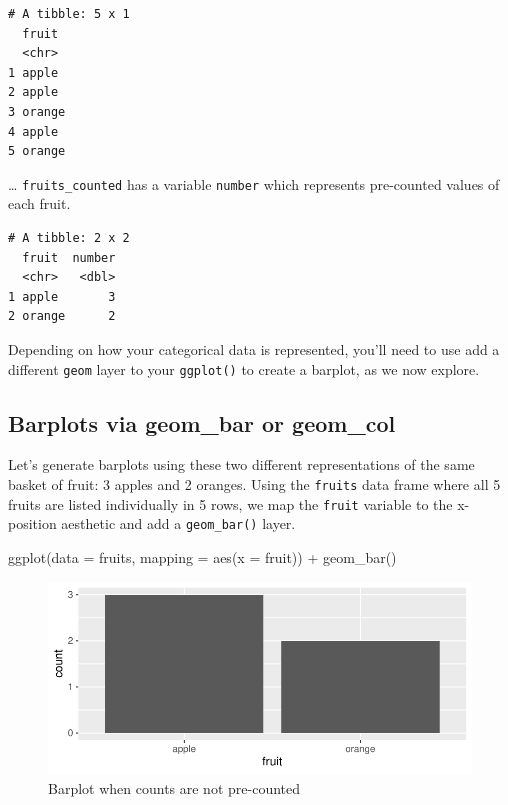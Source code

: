 \documentclass[
  letterpaper,
  DIV=11,
  numbers=noendperiod]{scrreprt}
\newenvironment{Shaded}{\begin{snugshade}}{\end{snugshade}}
\newcommand{\AttributeTok}[1]{\textcolor[rgb]{0.40,0.45,0.13}{#1}}
\newcommand{\FunctionTok}[1]{\textcolor[rgb]{0.28,0.35,0.67}{#1}}
\newcommand{\NormalTok}[1]{\textcolor[rgb]{0.00,0.23,0.31}{#1}}
\newcommand{\SpecialCharTok}[1]{\textcolor[rgb]{0.37,0.37,0.37}{#1}}
\theoremstyle{definition}
\theoremstyle{remark}
\begin{document}
\begin{verbatim}
# A tibble: 5 x 1
  fruit 
  <chr> 
1 apple 
2 apple 
3 orange
4 apple 
5 orange
\end{verbatim}

\ldots{} \texttt{fruits\_counted} has a variable \texttt{number} which
represents pre-counted values of each fruit.

\begin{verbatim}
# A tibble: 2 x 2
  fruit  number
  <chr>   <dbl>
1 apple       3
2 orange      2
\end{verbatim}

Depending on how your categorical data is represented, you'll need to
use add a different \texttt{geom} layer to your \texttt{ggplot()} to
create a barplot, as we now explore.

\hypertarget{barplots-via-geom_bar-or-geom_col}{%
\subsection{Barplots via geom\_bar or
geom\_col}\label{barplots-via-geom_bar-or-geom_col}}

Let's generate barplots using these two different representations of the
same basket of fruit: 3 apples and 2 oranges. Using the \texttt{fruits}
data frame where all 5 fruits are listed individually in 5 rows, we map
the \texttt{fruit} variable to the x-position aesthetic and add a
\texttt{geom\_bar()} layer.

\begin{Shaded}
\begin{Highlighting}[]
\FunctionTok{ggplot}\NormalTok{(}\AttributeTok{data =}\NormalTok{ fruits, }\AttributeTok{mapping =} \FunctionTok{aes}\NormalTok{(}\AttributeTok{x =}\NormalTok{ fruit)) }\SpecialCharTok{+}
  \FunctionTok{geom\_bar}\NormalTok{()}
\end{Highlighting}
\end{Shaded}

\begin{figure}[H]

{\centering \includegraphics{02-visualization_files/figure-pdf/fig-geombar-1.pdf}

}

\caption{\label{fig-geombar}Barplot when counts are not pre-counted}

\end{figure}
\end{document}
